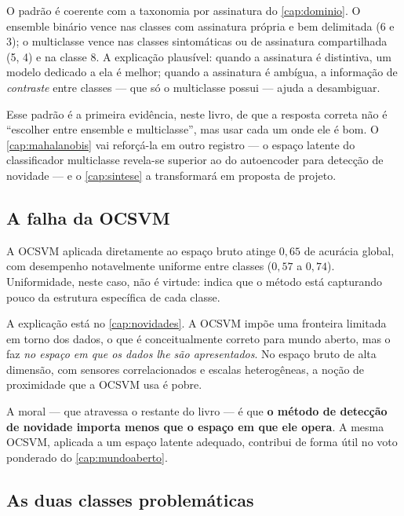 O padrão é coerente com a taxonomia por assinatura do \cref{cap:dominio}. O ensemble
binário vence nas classes com assinatura própria e bem delimitada (6 e 3); o
multiclasse vence nas classes sintomáticas ou de assinatura compartilhada (5, 4) e na
classe 8. A explicação plausível: quando a assinatura é distintiva, um modelo dedicado a
ela é melhor; quando a assinatura é ambígua, a informação de \emph{contraste} entre
classes --- que só o multiclasse possui --- ajuda a desambiguar.

\begin{destaque}
Esse padrão é a primeira evidência, neste livro, de que a resposta correta não é
``escolher entre ensemble e multiclasse'', mas usar cada um onde ele é bom. O
\cref{cap:mahalanobis} vai reforçá-la em outro registro --- o espaço latente do
classificador multiclasse revela-se superior ao do autoencoder para detecção de
novidade --- e o \cref{cap:sintese} a transformará em proposta de projeto.
\end{destaque}

\subsection{A falha da OCSVM}

A OCSVM aplicada diretamente ao espaço bruto atinge $0{,}65$ de acurácia global, com
desempenho notavelmente uniforme entre classes ($0{,}57$ a $0{,}74$). Uniformidade,
neste caso, não é virtude: indica que o método está capturando pouco da estrutura
específica de cada classe.

A explicação está no \cref{cap:novidades}. A OCSVM impõe uma fronteira limitada em torno
dos dados, o que é conceitualmente correto para mundo aberto, mas o faz \emph{no espaço
em que os dados lhe são apresentados}. No espaço bruto de alta dimensão, com sensores
correlacionados e escalas heterogêneas, a noção de proximidade que a OCSVM usa é
pobre.

A moral --- que atravessa o restante do livro --- é que \textbf{o método de detecção de
novidade importa menos que o espaço em que ele opera}. A mesma OCSVM, aplicada a um
espaço latente adequado, contribui de forma útil no voto ponderado do
\cref{cap:mundoaberto}.

\subsection{As duas classes problemáticas}

